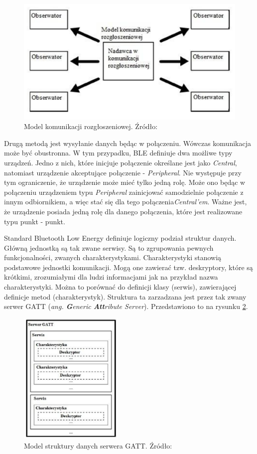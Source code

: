 \begin{figure}[H]
	\centering
	\includegraphics[width=12cm]{img/theory/BLE/ble_advertising.png}
	\caption{Model komunikacji rozgłoszeniowej. Źródło: \cite{inzynierka}}
	\label{fig:image_ble_advertising}
\end{figure}

Drugą metodą jest wysyłanie danych będąc w połączeniu. Wówczas komunikacja może być obustronna. W tym przypadku, BLE definiuje dwa możliwe typy urządzeń. Jedno z nich, które inicjuje połączenie określane jest jako \textit{Central}, natomiast urządzenie akceptujące połączenie - \textit{Peripheral}. Nie występuje przy tym ograniczenie, że urządzenie może mieć tylko jedną rolę. Może ono będąc w połączeniu urządzeniem typu \textit{Peripheral} zainicjować samodzielnie połączenie z innym odbiornikiem, a więc stać się dla tego połączenia\textit{Central'em}. Ważne jest, że urządzenie posiada jedną rolę dla danego połączenia, które jest realizowane typu punkt - punkt. 

Standard Bluetooth Low Energy definiuje logiczny podział struktur danych. Główną jednostką są tak zwane serwisy. Są to zgrupowania pewnych funkcjonalności, zwanych charakterystykami. Charakterystyki stanowią podstawowe jednostki komunikacji. Mogą one zawierać tzw. deskryptory, które są krótkimi, zrozumiałymi dla ludzi informacjami jak na przykład nazwa charakterystyki. Można to porównać do definicji klasy (serwis), zawierającej definicje metod (charakterystyk). Struktura ta zarzadzana jest przez tak zwany serwer GATT (\textit{ang. \textbf{G}eneric \textbf{Att}ribute Server}). Przedstawiono to na rysunku \ref{fig:image_ble_services}. 

\begin{figure}[H]
	\centering
	\includegraphics[width=5cm]{img/theory/BLE/ble_services.png}
	\caption{Model struktury danych serwera GATT. Źródło: \cite{inzynierka}}
	\label{fig:image_ble_services}
\end{figure}

